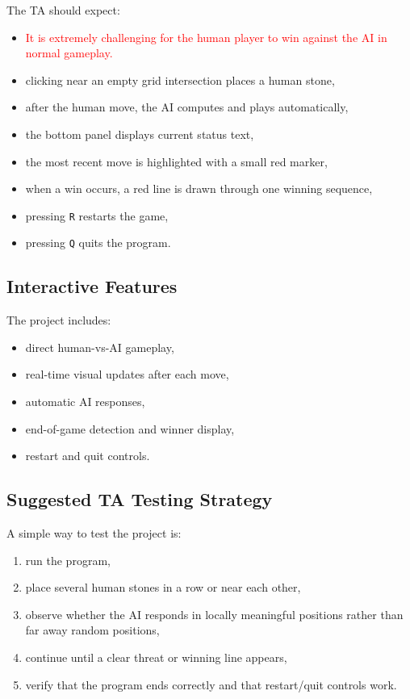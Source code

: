 \documentclass[11pt]{article}
\begin{document}
The TA should expect:
\begin{itemize}
    \item \textcolor{red}{It is extremely challenging for the human player to win against the AI in normal gameplay.}
    \item clicking near an empty grid intersection places a human stone,
    \item after the human move, the AI computes and plays automatically,
    \item the bottom panel displays current status text,
    \item the most recent move is highlighted with a small red marker,
    \item when a win occurs, a red line is drawn through one winning sequence,
    \item pressing \texttt{R} restarts the game,
    \item pressing \texttt{Q} quits the program.
\end{itemize}

\subsection*{Interactive Features}

The project includes:
\begin{itemize}
    \item direct human-vs-AI gameplay,
    \item real-time visual updates after each move,
    \item automatic AI responses,
    \item end-of-game detection and winner display,
    \item restart and quit controls.
\end{itemize}

\subsection*{Suggested TA Testing Strategy}

A simple way to test the project is:
\begin{enumerate}
    \item run the program,
    \item place several human stones in a row or near each other,
    \item observe whether the AI responds in locally meaningful positions rather than far away random positions,
    \item continue until a clear threat or winning line appears,
    \item verify that the program ends correctly and that restart/quit controls work.
\end{enumerate}
\end{document}
